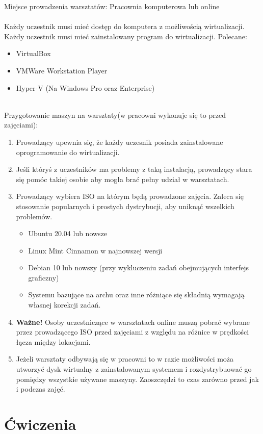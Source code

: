 \documentclass[10pt,a4paper]{article}
\begin{document}
Miejsce prowadzenia warsztatów: Pracownia komputerowa lub online \\\\
Każdy uczestnik musi mieć dostęp do komputera z możliwością wirtualizacji.\\
Każdy uczestnik musi mieć zainstalowany program do wirtualizacji. Polecane:
\begin{itemize}
\item VirtualBox
\item VMWare Workstation Player
\item Hyper-V (Na Windows Pro oraz Enterprise)\\\\
\end{itemize}

Przygotowanie maszyn na warsztaty(w pracowni wykonuje się to przed zajęciami):
\begin{enumerate}
\item Prowadzący upewnia się, że każdy uczesnik posiada zainstalowane oprogramowanie do wirtualizacji.
\item Jeśli któryś z uczestników ma problemy z taką instalacją, prowadzący stara się pomóc takiej osobie aby mogła brać pełny udział w warsztatach.
\item Prowadzący wybiera ISO na którym będą prowadzone zajęcia. Zaleca się stosowanie popularnych i prostych dystrybucji, aby uniknąć wszelkich problemów.
\begin{itemize}
\item Ubuntu 20.04 lub nowsze
\item Linux Mint Cinnamon w najnowszej wersji
\item Debian 10 lub nowszy (przy wykluczeniu zadań obejmujących interfejs graficzny)
\item Systemu bazujące na archu oraz inne różniące się składnią wymagają własnej korekcji zadań.
\end{itemize}
\item \textbf{Ważne!} Osoby uczestniczące w warsztatach  online muszą pobrać wybrane przez prowadzącego ISO przed zajęciami z względu na różnice w prędkości łącza między lokacjami.
\item Jeżeli warsztaty odbywają się w pracowni to w razie możliwości moża utworzyć dysk wirtualny z zainstalowanym systemem i rozdystrybuować go pomiędzy wszystkie używane maszyny. Zaoszczędzi to czas zarówno przed jak i podczas zajęć.
\end{enumerate}
\newpage

\section{Ćwiczenia}
\end{document}
